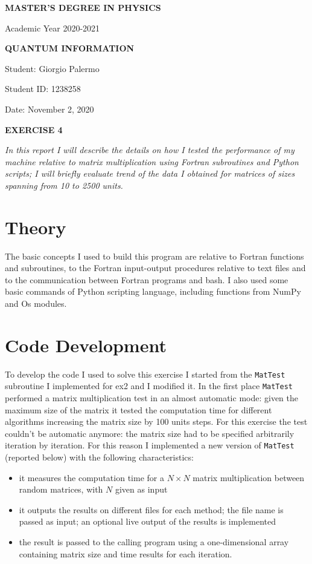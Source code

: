 \documentclass[a4paper]{article}
\newcommand{\thedate}{November 2, 2020}
\begin{document}
\hypersetup{linkcolor = black}
\hypersetup{linkcolor = blue}
\thispagestyle{plain}
\begin{center}
    \textbf{MASTER'S DEGREE IN PHYSICS}
    
    Academic Year 2020-2021
    
    \medskip
    \textbf{QUANTUM INFORMATION}
\end{center}

\vspace{0.0cm}
Student: Giorgio Palermo

Student ID: 1238258

Date: \thedate
\begin{center}
\textbf{EXERCISE 4}
\medskip
\end{center}
\noindent
\textit{In this report I will describe the details on how I tested the performance of my machine relative to matrix multiplication using Fortran subroutines and Python scripts; I will briefly evaluate trend of the data I obtained for matrices of sizes spanning from 10 to 2500 units. }
\section{Theory}
The basic concepts I used to build this program are relative to Fortran functions and subroutines, to the Fortran input-output procedures relative to text files and to the communication between Fortran programs and bash.
I also used some basic commands of Python scripting language, including functions from NumPy and Os modules.

\section*{Code Development}

To develop the code I used to solve this exercise I started from the \lstinline{MatTest} subroutine I implemented for ex2 and I modified it.
In the first place \lstinline{MatTest} performed a matrix multiplication test in an almost automatic mode: given the maximum size of the matrix it tested the computation time for different algorithms increasing the matrix size by 100 units steps.
For this exercise the test couldn't be automatic anymore: the matrix size had to be specified arbitrarily iteration by iteration.
For this reason I implemented a new version of \lstinline{MatTest} (reported below) with the following characteristics:
\begin{itemize}
    \item it measures the computation time for a $N\times N$ matrix multiplication between random matrices, with $N$ given as input
    \item it outputs the results on different files for each method; the file name is passed as input; an optional live output of the results is implemented
    \item the result is passed to the calling program using a one-dimensional array containing matrix size and time results for each iteration.

\end{itemize}
\end{document}
